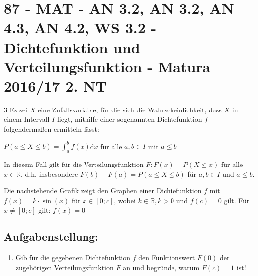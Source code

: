 \section{87 - MAT - AN 3.2, AN 3.2, AN 4.3, AN 4.2, WS 3.2 - Dichtefunktion und Verteilungsfunktion - Matura 2016/17 2. NT}

\begin{langesbeispiel} \item[3] %
						Es sei $X$ eine Zufallsvariable, für die sich die Wahrscheinlichkeit, dass $X$ in einem Intervall $I$ liegt, mithilfe einer sogenannten Dichtefunktion $f$ folgendermaßen ermitteln lässt:
						
						$P(a\leq X\leq b)=\displaystyle\int^b_a f(x)$d$x$ für alle $a,b\in I$ mit $a\leq b$
						
						In diesem Fall gilt für die Verteilungsfunktion $F:F(x)=P(X\leq x)$ für alle $x\in\mathbb{R}$, d.h. insbesondere $F(b)-F(a)=P(a\leq X\leq b)$ für $a,b\in I$ und $a\leq b$.
						
						Die nachstehende Grafik zeigt den Graphen einer Dichtefunktion $f$ mit $f(x)=k\cdot\sin(x)$ für $x\in[0;c]$, wobei $k\in\mathbb{R}, k>0$ und $f(c)=0$ gilt. Für $x\neq[0;c]$ gilt: $f(x)=0$.
						
						\begin{center}
						\end{center}

				\subsection{Aufgabenstellung:}
\begin{enumerate}
	\item Gib für die gegebenen Dichtefunktion $f$ den Funktionswert $F(0)$ der zugehörigen Verteilungsfunktion $F$ an und begründe, warum $F(c)=1$ ist!\leer
	

\end{enumerate}
\end{langesbeispiel}
